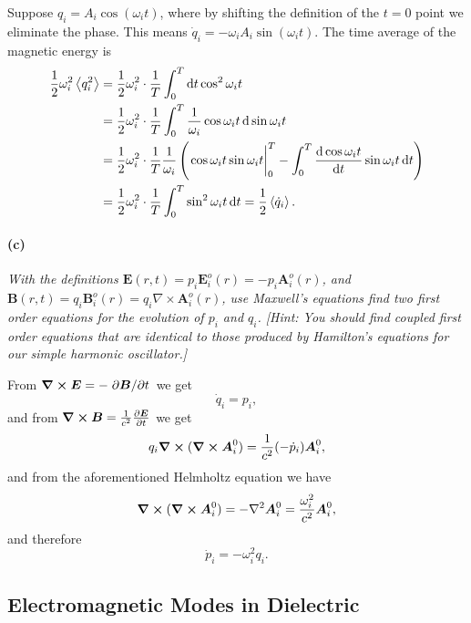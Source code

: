 \documentclass[hyperref, a4paper]{article}
\begin{document}
Suppose $q_i = A_i \cos(\omega_i t)$, where by shifting the definition of the $t=0$ point 
we eliminate the phase.
This means $\dot{q}_i = - \omega_i A_i \sin(\omega_i t)$.
The time average of the magnetic energy is 
\begin{equation}
    \begin{aligned}
        \frac{1}{2} \omega_i^2 \expval{q_i^2} 
        &= \frac{1}{2} \omega_i^2 \cdot \frac{1}{T} \int_{0}^{T} \dd{t} \cos^2 \omega_i t \\
        &= \frac{1}{2} \omega_i^2 \cdot \frac{1}{T} 
        \int_{0}^{T} \frac{1}{\omega_i} \cos \omega_i t \dd{\sin \omega_i t} \\
        &= \frac{1}{2} \omega_i^2 \cdot \frac{1}{T} \frac{1}{\omega_i} \left(
            \eval{\cos \omega_i t \sin \omega_i t}_0^{T}
            - \int_{0}^{T} \dv{\cos \omega_i t}{t} \sin \omega_i t \dd{t}
        \right) \\
        &=  \frac{1}{2} \omega_i^2 \cdot \frac{1}{T} \int_{0}^{T} \sin^2 \omega_i t \dd{t} 
        = \frac{1}{2} \expval{\dot{q}_i}.
    \end{aligned}
\end{equation} 

\paragraph*{(c)} \textit{
    With the definitions $\mathbf{E}(r, t)=p_i \mathbf{E}_i^o(r)=-p_i \mathbf{A}_i^o(r)$, and $\mathbf{B}(r, t)=q_i \mathbf{B}_i^o(r)=q_i \nabla \times \mathbf{A}_i^o(r)$, use Maxwell's equations find two first order equations for the evolution of $p_i$ and $q_i$. [Hint: You should find coupled first order equations that are identical to those produced by Hamilton's equations for our simple harmonic oscillator.]
}

From $\curl{\vb*{E}} = - \pdv*{\vb*{B}}{t}$ we get 
\begin{equation}
    \dot{q}_i = p_i, 
\end{equation}
and from $\curl{\vb*{B}} = \frac{1}{c^2} \pdv{\vb*{E}}{t}$ we get 
\[
    q_i \curl{(\curl{\vb*{A}_i^0})} = \frac{1}{c^2} (- \dot{p}_i) \vb*{A}_i^0, 
\]
and from the aforementioned Helmholtz equation we have 
\[
    \curl{(\curl{\vb*{A}_i^0})} = - \laplacian \vb*{A}_i^0
    = \frac{\omega_i^2}{c^2} \vb*{A}_i^0, 
\]
and therefore
\begin{equation}
    \dot{p}_i = - \omega_i^2 q_i.
\end{equation}

\subsection{Electromagnetic Modes in Dielectric}
\end{document}
